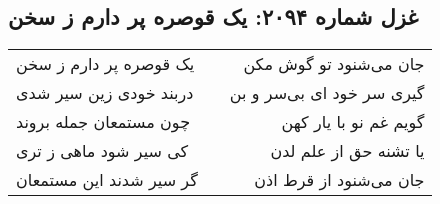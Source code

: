 \begin{center}
\section*{غزل شماره ۲۰۹۴: یک قوصره پر دارم ز سخن}
\label{sec:2094}
\begin{longtable}{l p{0.5cm} r}
یک قوصره پر دارم ز سخن
&&
جان می‌شنود تو گوش مکن
\\
دربند خودی زین سیر شدی
&&
گیری سر خود ای بی‌سر و بن
\\
چون مستمعان جمله بروند
&&
گویم غم نو با یار کهن
\\
کی سیر شود ماهی ز تری
&&
یا تشنه حق از علم لدن
\\
گر سیر شدند این مستمعان
&&
جان می‌شنود از قرط اذن
\\
\end{longtable}
\end{center}
